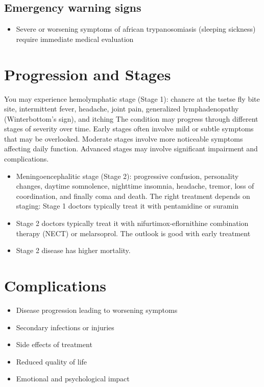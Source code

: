 \subsection{Emergency warning signs}
\begin{itemize}[noitemsep]
  \item Severe or worsening symptoms of african trypanosomiasis (sleeping sickness) require immediate medical evaluation
\end{itemize}
\section{Progression and Stages}
You may experience hemolymphatic stage (Stage 1): chancre at the tsetse fly bite site, intermittent fever, headache, joint pain, generalized lymphadenopathy (Winterbottom's sign), and itching The condition may progress through different stages of severity over time. Early stages often involve mild or subtle symptoms that may be overlooked. Moderate stages involve more noticeable symptoms affecting daily function. Advanced stages may involve significant impairment and complications.

\begin{itemize}[noitemsep]
  \item Meningoencephalitic stage (Stage 2): progressive confusion, personality changes, daytime somnolence, nighttime insomnia, headache, tremor, loss of coordination, and finally coma and death. The right treatment depends on staging: Stage 1 doctors typically treat it with pentamidine or suramin
  \item Stage 2 doctors typically treat it with nifurtimox-eflornithine combination therapy (NECT) or melarsoprol. The outlook is good with early treatment
  \item Stage 2 disease has higher mortality.
\end{itemize}
\section{Complications}
\begin{itemize}[noitemsep]
  \item Disease progression leading to worsening symptoms
  \item Secondary infections or injuries
  \item Side effects of treatment
  \item Reduced quality of life
  \item Emotional and psychological impact
\end{itemize}

